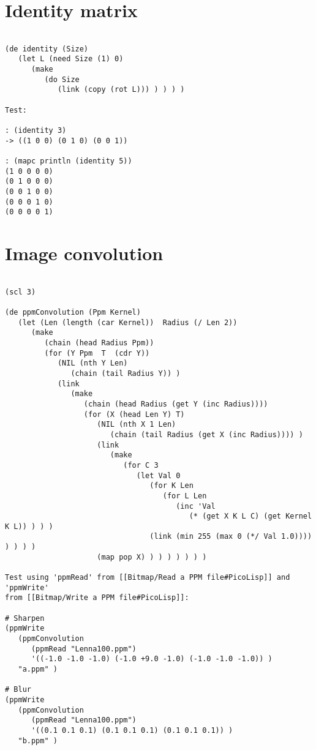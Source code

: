 \section*{Identity matrix}

\begin{verbatim}

(de identity (Size)
   (let L (need Size (1) 0)
      (make
         (do Size
            (link (copy (rot L))) ) ) ) )

Test:

: (identity 3)
-> ((1 0 0) (0 1 0) (0 0 1))

: (mapc println (identity 5))
(1 0 0 0 0)
(0 1 0 0 0)
(0 0 1 0 0)
(0 0 0 1 0)
(0 0 0 0 1)

\end{verbatim}

\section*{Image convolution}

\begin{verbatim}

(scl 3)

(de ppmConvolution (Ppm Kernel)
   (let (Len (length (car Kernel))  Radius (/ Len 2))
      (make
         (chain (head Radius Ppm))
         (for (Y Ppm  T  (cdr Y))
            (NIL (nth Y Len)
               (chain (tail Radius Y)) )
            (link
               (make
                  (chain (head Radius (get Y (inc Radius))))
                  (for (X (head Len Y) T)
                     (NIL (nth X 1 Len)
                        (chain (tail Radius (get X (inc Radius)))) )
                     (link
                        (make
                           (for C 3
                              (let Val 0
                                 (for K Len
                                    (for L Len
                                       (inc 'Val
                                          (* (get X K L C) (get Kernel K L)) ) ) )
                                 (link (min 255 (max 0 (*/ Val 1.0)))) ) ) ) )
                     (map pop X) ) ) ) ) ) ) )

Test using 'ppmRead' from [[Bitmap/Read a PPM file#PicoLisp]] and 'ppmWrite'
from [[Bitmap/Write a PPM file#PicoLisp]]:

# Sharpen
(ppmWrite
   (ppmConvolution
      (ppmRead "Lenna100.ppm")
      '((-1.0 -1.0 -1.0) (-1.0 +9.0 -1.0) (-1.0 -1.0 -1.0)) )
   "a.ppm" )

# Blur
(ppmWrite
   (ppmConvolution
      (ppmRead "Lenna100.ppm")
      '((0.1 0.1 0.1) (0.1 0.1 0.1) (0.1 0.1 0.1)) )
   "b.ppm" )

\end{verbatim}

